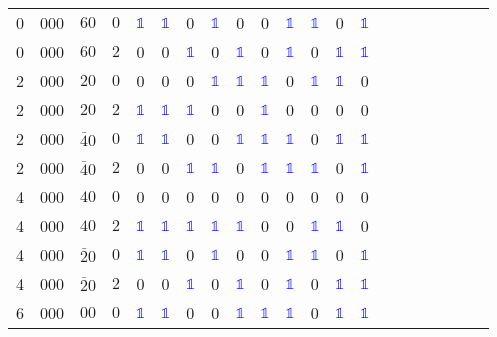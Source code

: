 \begin{longtable*}{c| cccccccccccccccccccc }
 0& 000& $60$& $0$& \textcolor{blue}{$\mathds{1}$}& \textcolor{blue}{$\mathds{1}$}& 0& \textcolor{blue}{$\mathds{1}$}& 0& 0& \textcolor{blue}{$\mathds{1}$}& \textcolor{blue}{$\mathds{1}$}& 0& \textcolor{blue}{$\mathds{1}$}\\
 0& 000& $60$& $2$& 0& 0& \textcolor{blue}{$\mathds{1}$}& 0& \textcolor{blue}{$\mathds{1}$}& 0& \textcolor{blue}{$\mathds{1}$}& 0& \textcolor{blue}{$\mathds{1}$}& \textcolor{blue}{$\mathds{1}$}\\
 2& 000& $20$& $0$& 0& 0& 0& \textcolor{blue}{$\mathds{1}$}& \textcolor{blue}{$\mathds{1}$}& \textcolor{blue}{$\mathds{1}$}& 0& \textcolor{blue}{$\mathds{1}$}& \textcolor{blue}{$\mathds{1}$}& 0\\
 2& 000& $20$& $2$& \textcolor{blue}{$\mathds{1}$}& \textcolor{blue}{$\mathds{1}$}& \textcolor{blue}{$\mathds{1}$}& 0& 0& \textcolor{blue}{$\mathds{1}$}& 0& 0& 0& 0\\
 2& 000& $\bar{4}0$& $0$& \textcolor{blue}{$\mathds{1}$}& \textcolor{blue}{$\mathds{1}$}& 0& 0& \textcolor{blue}{$\mathds{1}$}& \textcolor{blue}{$\mathds{1}$}& \textcolor{blue}{$\mathds{1}$}& 0& \textcolor{blue}{$\mathds{1}$}& \textcolor{blue}{$\mathds{1}$}\\
 2& 000& $\bar{4}0$& $2$& 0& 0& \textcolor{blue}{$\mathds{1}$}& \textcolor{blue}{$\mathds{1}$}& 0& \textcolor{blue}{$\mathds{1}$}& \textcolor{blue}{$\mathds{1}$}& \textcolor{blue}{$\mathds{1}$}& 0& \textcolor{blue}{$\mathds{1}$}\\
 4& 000& $40$& $0$& 0& 0& 0& 0& 0& 0& 0& 0& 0& 0\\
 4& 000& $40$& $2$& \textcolor{blue}{$\mathds{1}$}& \textcolor{blue}{$\mathds{1}$}& \textcolor{blue}{$\mathds{1}$}& \textcolor{blue}{$\mathds{1}$}& \textcolor{blue}{$\mathds{1}$}& 0& 0& \textcolor{blue}{$\mathds{1}$}& \textcolor{blue}{$\mathds{1}$}& 0\\
 4& 000& $\bar{2}0$& $0$& \textcolor{blue}{$\mathds{1}$}& \textcolor{blue}{$\mathds{1}$}& 0& \textcolor{blue}{$\mathds{1}$}& 0& 0& \textcolor{blue}{$\mathds{1}$}& \textcolor{blue}{$\mathds{1}$}& 0& \textcolor{blue}{$\mathds{1}$}\\
 4& 000& $\bar{2}0$& $2$& 0& 0& \textcolor{blue}{$\mathds{1}$}& 0& \textcolor{blue}{$\mathds{1}$}& 0& \textcolor{blue}{$\mathds{1}$}& 0& \textcolor{blue}{$\mathds{1}$}& \textcolor{blue}{$\mathds{1}$}\\
 6& 000& $00$& $0$& \textcolor{blue}{$\mathds{1}$}& \textcolor{blue}{$\mathds{1}$}& 0& 0& \textcolor{blue}{$\mathds{1}$}& \textcolor{blue}{$\mathds{1}$}& \textcolor{blue}{$\mathds{1}$}& 0& \textcolor{blue}{$\mathds{1}$}& \textcolor{blue}{$\mathds{1}$}\\

\end{longtable*}
